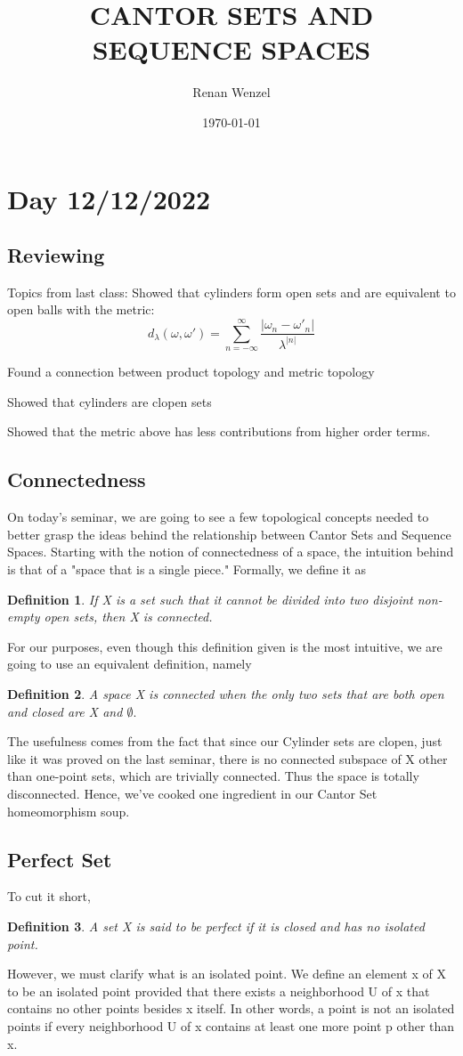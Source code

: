 \documentclass{article}
\title{CANTOR SETS AND SEQUENCE SPACES}
\author{Renan Wenzel}
\date{\today}
\newtheorem*{def*}{Definition}
\begin{document}
\maketitle

\section*{Day 12/12/2022}
\subsection{Reviewing}
Topics from last class:
Showed that cylinders form open sets and are equivalent to open balls with the metric:
  $$
  d_{\lambda}(\omega, \omega') = \sum_{n=-\infty}^{\infty}\frac{|\omega _{n} - \omega' _{n}|}{\lambda ^{|n|}}
  $$

Found a connection between product topology and metric topology

Showed that cylinders are clopen sets

Showed that the metric above has less contributions from higher order terms.
\subsection{Connectedness}
On today's seminar, we are going to see a few topological concepts needed to better grasp the ideas behind
the relationship between Cantor Sets and Sequence Spaces. Starting with the notion of connectedness of a space,
the intuition behind is that of a "space that is a single piece." Formally, we define it as
\begin{def*}
  If X is a set such that it cannot be divided into two disjoint non-empty open sets, then X is connected.
\end{def*}
For our purposes, even though this definition given is the most intuitive, we are going to use an equivalent 
definition, namely 
 \begin{def*}
   A space X is connected when the only two sets that are both open and closed are X and $\emptyset.$
 \end{def*}
 The usefulness comes from the fact that since our Cylinder sets are clopen, just like it was proved on the last
seminar, there is no connected subspace of X other than one-point sets, which are trivially connected. Thus the 
space is totally disconnected. Hence, we've cooked one ingredient in our Cantor Set homeomorphism soup.

\subsection{Perfect Set}
To cut it short, 
\begin{def*}
  A set X is said to be perfect if it is closed and has no isolated point.
\end{def*}
However, we must clarify what is an isolated point. We define an element x of X to be an isolated point provided
that there exists a neighborhood U of x that contains no other points besides x itself. In other words,
a point is not an isolated points if every neighborhood U of x contains at least one more point p other than x.
\end{document}
